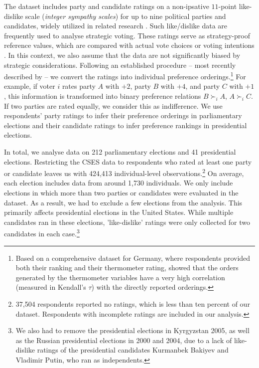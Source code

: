 \documentclass[12pt]{scrartcl}
\newcommand{\nbparliament}{212 }
\newcommand{\nbpresidential}{41 }
\begin{document}
The dataset includes party and candidate ratings on a non-ipsative $11$-point like-dislike scale (\emph{integer sympathy scales}) for up to nine political parties and candidates, widely utilized in related research \citep[e.g.,][]{Kalandrakis2022, Desai2025}. Such like/dislike data are frequently used to analyse strategic voting. These ratings serve as strategy-proof reference values, which are compared with actual vote choices or voting intentions \citep{Abramson2009, Eggers2024, Nunez2024}. In this context, we also assume that the data are not significantly biased by strategic considerations. Following an established procedure -- most recently described by \citet{Lachat2024} -- we convert the ratings into individual preference orderings.\footnote{
    Based on a comprehensive dataset for Germany, where respondents provided both their ranking and their thermometer rating, \cite{Barbaro2022} showed that the orders generated by the thermometer variables have a very high correlation (measured in Kendall's $\tau$) with the directly reported orderings.
} For example, if voter $i$ rates party $A$ with $+2$, party $B$ with $+4$, and party $C$ with $+1$, this information is transformed into binary preference relations $B \succ_i A$, $A \succ_i C$. If two parties are rated equally, we consider this as indifference. We use respondents' party ratings to infer their preference orderings in parliamentary elections and their candidate ratings to infer preference rankings in presidential elections.

In total, we analyse data on \nbparliament parliamentary elections and \nbpresidential presidential elections.  Restricting the CSES data to respondents who rated at least one party or candidate leaves us with 424,413 individual-level observations.\footnote{
    37,504 respondents reported no ratings, which is less than ten percent of our dataset. Respondents with incomplete ratings are included in our analysis.
} On average, each election includes data from around 1,730 individuals.  We only include elections in which more than two parties or candidates were evaluated in the dataset. As a result, we had to exclude a few elections from the analysis. This primarily affects presidential elections in the United States. While multiple candidates ran in these elections, 'like-dislike' ratings were only collected for two candidates in each case.\footnote{
    We also had to remove the presidential elections in Kyrgyzstan 2005, as well as the Russian presidential elections in 2000 and 2004, due to a lack of like-dislike ratings of the presidential candidates Kurmanbek Bakiyev and Vladimir Putin, who ran as independents.}
\end{document}
